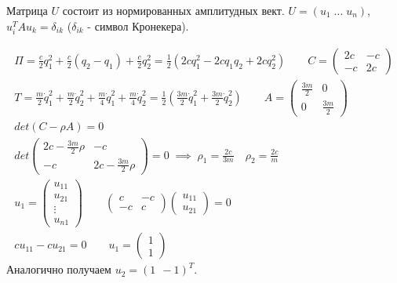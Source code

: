 \documentclass{article}
\begin{document}
Матрица $U$ состоит из нормированных амплитудных вект.
$U=(u_1 \; \dots \; u_n)$, $u_i^{T}Au_k=\delta_{ik}$ ($\delta_{ik}$ - символ Кронекера).

\begin{eg}

  \begin{gather*}
    \Pi=\frac{c}{2}q_1^{2}+\frac{c}{2}(q_2-q_1)+\frac{c}{2}q_2^{2}= \frac{1}{2}(2cq_1^{2}-2cq_1q_2+2cq_2^{2})
    \qquad C = \begin{pmatrix}
      2c & -c \\ 
      -c & 2c
    \end{pmatrix} \\ 
    T=\frac{m}{2}\dot{q}_1^{2} + \frac{m}{2}\dot{q}_2^{2}+\frac{m}{4}\dot{q}_1^{2}+\frac{m}{4}\dot{q}_2^{2}=\frac{1}{2}(\frac{3m}{2}\dot{q}_1^{2}+\frac{3m}{2}\dot{q}_2^{2})
    \qquad A = \begin{pmatrix}
      \frac{3m}{2} & 0 \\ 
      0 & \frac{3m}{2}
    \end{pmatrix} \\ 
    det(C-\rho A)=0 \\ 
    det\begin{pmatrix}
      2c-\frac{3m}{2}\rho & -c \\ 
      -c & 2c-\frac{3m}{2}\rho
    \end{pmatrix}=0 \; \implies \; \rho_1=\frac{2c}{3m} \quad \rho_2=\frac{2c}{m} \\ 
    u_1=\begin{pmatrix}
      u_{11} \\ u_{21} \\ \vdots \\ u_{n1}
    \end{pmatrix} \qquad \begin{pmatrix}
      c & -c \\ 
      -c & c
    \end{pmatrix} \begin{pmatrix}
      u_{11} \\ u_{21}
    \end{pmatrix} = 0 \\ 
    cu_{11} - c u_{21} =0 \qquad u_1=\begin{pmatrix}
      1 \\ 1
    \end{pmatrix}
  \end{gather*}
  Аналогично получаем $u_2=(1 \ \ -1)^{T}$. 


\end{eg}
\end{document}
